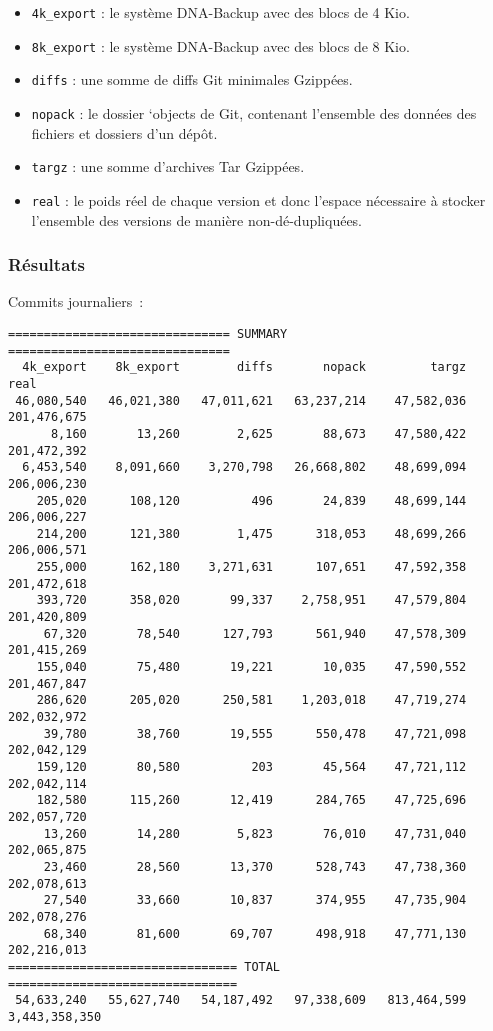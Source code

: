 \documentclass[a4paper]{article}
\begin{document}
\begin{itemize}
\item
  \verb|4k_export| : le système DNA-Backup avec des blocs de 4 Kio.
\item
  \verb|8k_export| : le système DNA-Backup avec des blocs de 8 Kio.
\item
  \verb|diffs| : une somme de diffs Git minimales Gzippées.
\item
  \verb|nopack| : le dossier `objects de Git, contenant l'ensemble des
  données des fichiers et dossiers d'un dépôt.
\item
  \verb|targz| : une somme d'archives Tar Gzippées.
\item
  \verb|real| : le poids réel de chaque version et donc l'espace
  nécessaire à stocker l'ensemble des versions de manière
  non-dé-dupliquées.
\end{itemize}

\subsubsection{Résultats}

Commits journaliers~:

\begin{verbatim}
=============================== SUMMARY ===============================
  4k_export    8k_export        diffs       nopack         targz           real
 46,080,540   46,021,380   47,011,621   63,237,214    47,582,036    201,476,675
      8,160       13,260        2,625       88,673    47,580,422    201,472,392
  6,453,540    8,091,660    3,270,798   26,668,802    48,699,094    206,006,230
    205,020      108,120          496       24,839    48,699,144    206,006,227
    214,200      121,380        1,475      318,053    48,699,266    206,006,571
    255,000      162,180    3,271,631      107,651    47,592,358    201,472,618
    393,720      358,020       99,337    2,758,951    47,579,804    201,420,809
     67,320       78,540      127,793      561,940    47,578,309    201,415,269
    155,040       75,480       19,221       10,035    47,590,552    201,467,847
    286,620      205,020      250,581    1,203,018    47,719,274    202,032,972
     39,780       38,760       19,555      550,478    47,721,098    202,042,129
    159,120       80,580          203       45,564    47,721,112    202,042,114
    182,580      115,260       12,419      284,765    47,725,696    202,057,720
     13,260       14,280        5,823       76,010    47,731,040    202,065,875
     23,460       28,560       13,370      528,743    47,738,360    202,078,613
     27,540       33,660       10,837      374,955    47,735,904    202,078,276
     68,340       81,600       69,707      498,918    47,771,130    202,216,013
================================ TOTAL ================================
 54,633,240   55,627,740   54,187,492   97,338,609   813,464,599  3,443,358,350
\end{verbatim}
\end{document}
